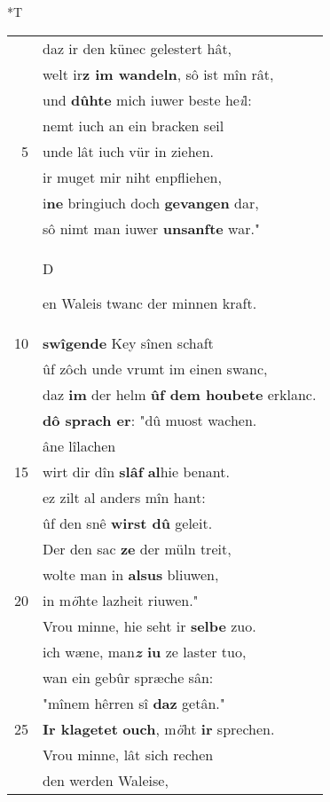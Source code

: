 \documentclass[8pt,a4paper,notitlepage]{article}
\begin{document}
\begin{table}[ht]
\begin{minipage}[t]{0.5\linewidth}
\small
\begin{center}*T
\end{center}
\begin{tabular}{rl}
 & daz ir den künec gelestert hât,\\ 
 & welt ir\textbf{z im wandeln}, sô ist mîn rât,\\ 
 & und \textbf{dûhte} mich iuwer beste he\textit{i}l:\\ 
 & nemt iuch an ein bracken seil\\ 
5 & unde lât iuch vür in ziehen.\\ 
 & ir muget mir niht enpfliehen,\\ 
 & i\textbf{ne} bringiuch doch \textbf{gevangen} dar,\\ 
 & sô nimt man iuwer \textbf{unsanfte} war."\\ 
 & \begin{large}D\end{large}en Waleis twanc der minnen kraft.\\ 
10 & \textbf{swîgende} Key sînen schaft\\ 
 & ûf zôch unde vrumt im einen swanc,\\ 
 & daz \textbf{im} der helm \textbf{ûf dem houbete} erklanc.\\ 
 & \textbf{dô sprach er}: "dû muost wachen.\\ 
 & âne lîlachen\\ 
15 & wirt dir dîn \textbf{slâf} \textbf{al}hie benant.\\ 
 & ez zilt al anders mîn hant:\\ 
 & ûf den snê \textbf{wirst dû} geleit.\\ 
 & Der den sac \textbf{ze} der müln treit,\\ 
 & wolte man in \textbf{alsus} bliuwen,\\ 
20 & in m\textit{ö}hte lazheit riuwen."\\ 
 & Vrou minne, hie seht ir \textbf{selbe} zuo.\\ 
 & ich wæne, man\textbf{\textit{z} iu} ze laster tuo,\\ 
 & wan ein gebûr spræche sân:\\ 
 & "mînem hêrren sî \textbf{daz} getân."\\ 
25 & \textbf{Ir klagetet} \textbf{ouch}, m\textit{ö}ht \textbf{ir} sprechen.\\ 
 & Vrou minne, lât sich rechen\\ 
 & den werden Waleise,\\ 

\end{tabular}
\end{minipage}
\end{table}
\end{document}
